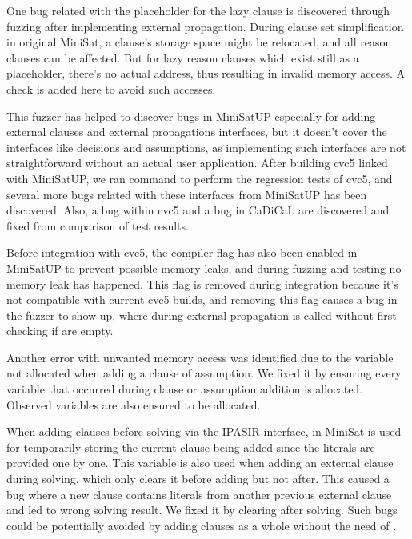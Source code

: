 One bug related with the placeholder for the lazy clause is discovered through fuzzing after implementing external propagation. During clause set simplification in original MiniSat, a clause's storage space might be relocated, and all reason clauses can be affected. But for lazy reason clauses which exist still as a placeholder, there's no actual address, thus resulting in invalid memory access. A check is added here to avoid such accesses.

This fuzzer has helped to discover bugs in MiniSatUP especially for adding external clauses and external propagations interfaces, but it doesn't cover the interfaces like decisions and assumptions, as implementing such interfaces are not straightforward without an actual user application. After building cvc5 linked with MiniSatUP, we ran  command to perform the regression tests of cvc5, and several more bugs related with these interfaces from MiniSatUP has been discovered. Also, a bug within cvc5 and a bug in CaDiCaL are discovered and fixed from comparison of test results.

Before integration with cvc5, the compiler flag  has also been enabled in MiniSatUP to prevent possible memory leaks, and during fuzzing and testing no memory leak has happened. This flag is removed during integration because it's not compatible with current cvc5 builds, and removing this flag causes a bug in the fuzzer to show up, where during external propagation  is called without first checking if  are empty.

Another error with unwanted memory access was identified due to the variable not allocated when adding a clause of assumption. We fixed it by ensuring every variable that occurred during clause or assumption addition is allocated. Observed variables are also ensured to be allocated.

When adding clauses before solving via the IPASIR interface,  in MiniSat is used for temporarily storing the current clause being added since the literals are provided one by one. This variable is also used when adding an external clause during solving, which only clears it before adding but not after. This caused a bug where a new clause contains literals from another previous external clause and led to wrong solving result. We fixed it by clearing  after solving. Such bugs could be potentially avoided by adding clauses as a whole without the need of .

